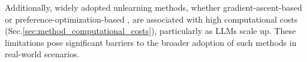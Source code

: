 %
%
Additionally, widely adopted unlearning methods, whether gradient-ascent-based \citep{jang2022knowledge, yao2023large, liu2022continual} or preference-optimization-based \citep{rafailov2024direct, zhang2024negative}, are associated with high computational costs (Sec.\ref{sec:method_computational_costs}), particularly as LLMs scale up.
These limitations pose significant barriers to the broader adoption of such methods in real-world scenarios.


